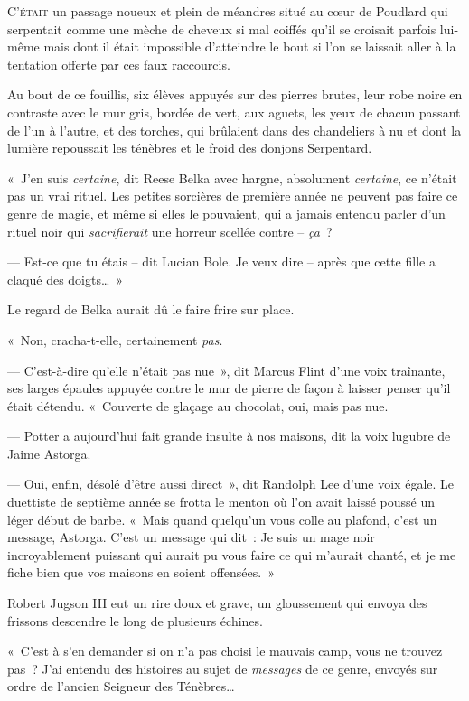 
\lettrine{C}{'était} un passage noueux et plein de méandres situé au cœur de Poudlard qui serpentait comme une mèche de cheveux si mal coiffés qu'il se croisait parfois lui-même mais dont il était impossible d'atteindre le bout si l'on se laissait aller à la tentation offerte par ces faux raccourcis.

Au bout de ce fouillis, six élèves appuyés sur des pierres brutes, leur robe noire en contraste avec le mur gris, bordée de vert, aux aguets, les yeux de chacun passant de l'un à l'autre, et des torches, qui brûlaient dans des chandeliers à nu et dont la lumière repoussait les ténèbres et le froid des donjons Serpentard.

«~J'en suis \emph{certaine}, dit Reese Belka avec hargne, absolument \emph{certaine}, ce n'était pas un vrai rituel. Les petites sorcières de première année ne peuvent pas faire ce genre de magie, et même si elles le pouvaient, qui a jamais entendu parler d'un rituel noir qui \emph{sacrifierait} une horreur scellée contre -- \emph{ça}~?

--- Est-ce que tu étais -- dit Lucian Bole. Je veux dire -- après que cette fille a claqué des doigts…~»

Le regard de Belka aurait dû le faire frire sur place.

«~Non, cracha-t-elle, certainement \emph{pas}.

--- C'est-à-dire qu'elle n'était pas nue~», dit Marcus Flint d'une voix traînante, ses larges épaules appuyée contre le mur de pierre de façon à laisser penser qu'il était détendu. «~Couverte de glaçage au chocolat, oui, mais pas nue.

--- Potter a aujourd'hui fait grande insulte à nos maisons, dit la voix lugubre de Jaime Astorga.

--- Oui, enfin, désolé d'être aussi direct~», dit Randolph Lee d'une voix égale. Le duettiste de septième année se frotta le menton où l'on avait laissé poussé un léger début de barbe. «~Mais quand quelqu'un vous colle au plafond, c'est un message, Astorga. C'est un message qui dit~: Je suis un mage noir incroyablement puissant qui aurait pu vous faire ce qui m'aurait chanté, et je me fiche bien que vos maisons en soient offensées.~»

Robert Jugson III eut un rire doux et grave, un gloussement qui envoya des frissons descendre le long de plusieurs échines.

«~C'est à s'en demander si on n'a pas choisi le mauvais camp, vous ne trouvez pas~? J'ai entendu des histoires au sujet de \emph{messages} de ce genre, envoyés sur ordre de l'ancien Seigneur des Ténèbres…

